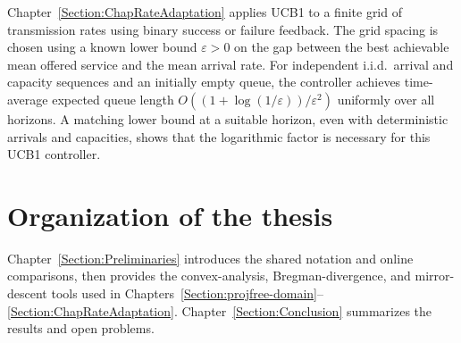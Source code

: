 Chapter~\ref{Section:ChapRateAdaptation} applies UCB1 to a finite grid of
transmission rates using binary success or failure feedback. The grid spacing
is chosen using a known lower bound $\varepsilon>0$ on the gap between the best
achievable mean offered service and the mean arrival rate. For
independent i.i.d.\ arrival and capacity sequences and an initially empty
queue, the controller achieves time-average expected queue length
$O((1+\log(1/\varepsilon))/\varepsilon^2)$ uniformly over all horizons.
A matching lower bound at a suitable horizon, even with deterministic
arrivals and capacities, shows that the logarithmic factor is necessary
for this UCB1 controller.

\section{Organization of the thesis}

Chapter~\ref{Section:Preliminaries} introduces the shared notation and
online comparisons, then provides the convex-analysis,
Bregman-divergence, and mirror-descent tools used in Chapters~\ref{Section:projfree-domain}--\ref{Section:ChapRateAdaptation}.
Chapter~\ref{Section:Conclusion} summarizes the results and open problems.
